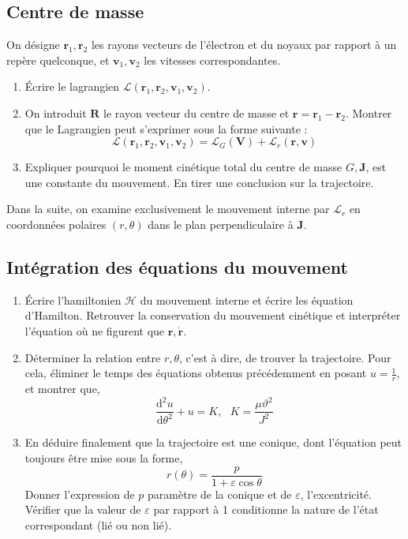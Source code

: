 \documentclass[a4paper,10pt]{report}
\begin{document}
	\subsection{Centre de masse}
	On désigne $\textbf{r}_1, \textbf{r}_2$ les rayons vecteurs de l'électron et du noyaux par rapport à un repère quelconque, et $\textbf{v}_1, \textbf{v}_2$ les vitesses correspondantes. 
	\begin{enumerate}
		\item Écrire le lagrangien $\mathcal{L}(\textbf{r}_1, \textbf{r}_2,\textbf{v}_1, \textbf{v}_2)$.
		\item On introduit $\textbf{R}$ le rayon vecteur du centre de masse et $\textbf{r} = \textbf{r}_1 - \textbf{r}_2$. Montrer que le Lagrangien peut s'exprimer sous la forme suivante :
		$$\mathcal{L}(\textbf{r}_1, \textbf{r}_2,\textbf{v}_1, \textbf{v}_2) = \mathcal{L}_G(\textbf{V}) + \mathcal{L}_r(\textbf{r}, \textbf{v})$$
		\item Expliquer pourquoi le moment cinétique total du centre de masse $G, \textbf{J}$, est une constante du mouvement. En tirer une conclusion sur la trajectoire.
	\end{enumerate}
	Dans la suite, on examine exclusivement le mouvement interne par $\mathcal{L}_r$ en coordonnées polaires $(r, \theta)$ dans le plan perpendiculaire à $\textbf{J}$.
	\subsection{Intégration des équations du mouvement}
\begin{enumerate}
	\item Écrire l'hamiltonien $\mathcal{H}$ du mouvement interne et écrire les équation d'Hamilton.
	Retrouver la conservation du mouvement cinétique et interpréter l'équation où ne figurent que $\textbf{r}, \dot{\mathbf{r}}$.
	\item Déterminer la relation entre $r, \theta$, c'est à dire, de trouver la trajectoire. Pour cela, éliminer le temps des équations obtenus précédemment en posant $u = \frac 1 r$, et montrer que, $$\frac{\text{d}^2u}{\text{d}\theta^2} + u =K, \text{ } K = \frac {\mu \vartheta^2}{J^2}$$
	\item En déduire finalement que la trajectoire est une conique, dont l'équation peut toujours être mise sous la forme,
	\begin{equation*}
		r(\theta) = \frac p {1+\varepsilon \cos \theta}
	\end{equation*}
	Donner l'expression de $p$ paramètre de la conique et de $\varepsilon$, l'excentricité. Vérifier que la valeur de $\varepsilon$ par rapport à 1 conditionne la nature de l'état correspondant (lié ou non lié).
\end{enumerate}
\end{document}
